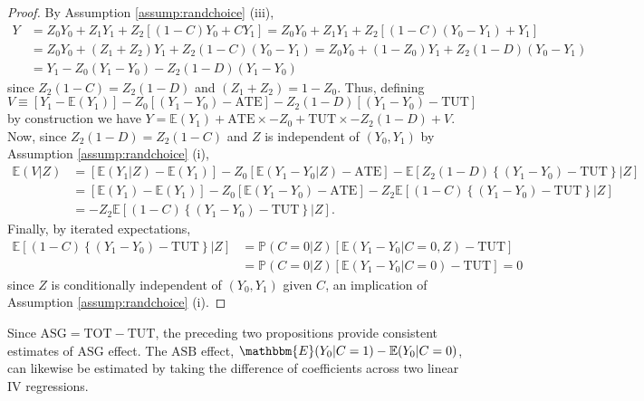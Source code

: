 \begin{proof}
By Assumption \ref{assump:randchoice} (iii),
\begin{align*}
Y &= Z_0 Y_0 + Z_1 Y_1 + Z_2[(1 - C) Y_0 + CY_1] = Z_0 Y_0 + Z_1 Y_1 + Z_2[(1 - C) (Y_0 - Y_1) + Y_1]\\
&= Z_0 Y_0 + (Z_1 + Z_2) Y_1 + Z_2(1 - C) (Y_0 - Y_1) = Z_0 Y_0 + (1 - Z_0) Y_1 + Z_2(1 - D) (Y_0 - Y_1) \\
&= Y_1 - Z_0 (Y_1 - Y_0) - Z_2(1 - D) (Y_1 - Y_0)
\end{align*}
since $Z_2(1 - C)= Z_2(1 - D)$ and $(Z_1 + Z_2) = 1 - Z_0$.
Thus, defining 
\[
V \equiv [Y_1 - \mathbb{E}(Y_1)] - Z_0[(Y_1 - Y_0) - \text{ATE}] - Z_2(1 - D)[(Y_1 - Y_0) - \text{TUT}]
\]
by construction we have $Y = \mathbb{E}(Y_1) + \text{ATE} \times -Z_0 + \text{TUT} \times -Z_2(1 - D) + V$.
Now, since $Z_2(1 - D) = Z_2 (1 - C)$ and $Z$ is independent of $(Y_0, Y_1)$ by Assumption \ref{assump:randchoice} (i),
\begin{align*}
\mathbb{E}(V|Z) &= [\mathbb{E}(Y_1|Z) - \mathbb{E}(Y_1)] - Z_0[\mathbb{E}(Y_1 - Y_0|Z) - \text{ATE}] - \mathbb{E}[Z_2(1 - D)\left\{(Y_1 - Y_0) - \text{TUT}\right\}|Z]\\
&= [\mathbb{E}(Y_1) - \mathbb{E}(Y_1)] - Z_0[\mathbb{E}(Y_1 - Y_0) - \text{ATE}] - Z_2\mathbb{E}[(1 - C)\left\{(Y_1 - Y_0) - \text{TUT}\right\}|Z]\\
&= -Z_2\mathbb{E}[(1 - C)\left\{(Y_1 - Y_0) - \text{TUT}\right\}|Z].
\end{align*}
Finally, by iterated expectations,
\begin{align*}
\mathbb{E}[(1 - C)\left\{(Y_1 - Y_0) - \text{TUT}\right\}|Z]&= \mathbb{P}(C=0|Z)\left[ \mathbb{E}(Y_1 - Y_0|C=0, Z) - \text{TUT}\right]\\
&= \mathbb{P}(C=0|Z) \left[ \mathbb{E}(Y_1 - Y_0|C=0) - \text{TUT}\right] = 0
\end{align*}
since $Z$ is conditionally independent of $(Y_0, Y_1)$ given $C$, an implication of Assumption \ref{assump:randchoice} (i).
\end{proof}

Since $\text{ASG} = \text{TOT} - \text{TUT}$, the preceding two propositions provide consistent estimates of $\text{ASG}$ effect.
The $\text{ASB}$ effect, $\mathbbm{E}(Y_0|C=1) - \mathbb{E}(Y_0|C=0)$, can likewise be estimated by taking the difference of coefficients across two linear IV regressions. %

